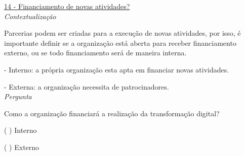 \underline{14 - Financiamento de novas atividades?}\\

\textit{Contextualização}

Parcerias podem ser criadas para a execução de novas atividades, por isso, é importante definir se a organização está aberta para receber financiamento externo, ou se todo financiamento será de maneira interna.

- Interno: a própria organização esta apta em financiar novas atividades.

- Externa: a organização necessita de patrocinadores.\\


\textit{Pergunta}

Como a organização financiará a realização da transformação digital?

( ) Interno

( ) Externo